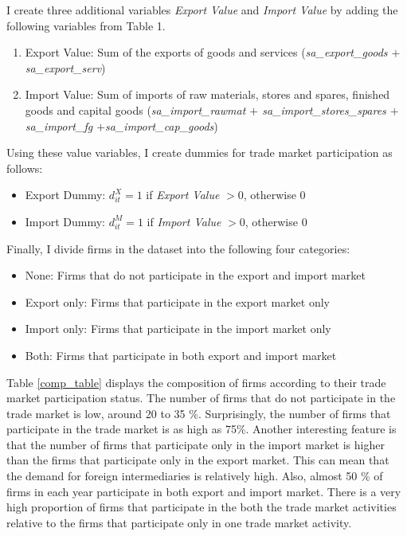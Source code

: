 \documentclass[12pt]{article}
\begin{document}
I create three additional variables \textit{Export Value} and
\textit{Import Value}
by adding the following variables from Table 1.  
\begin{enumerate}
\item Export Value: Sum of the exports of goods and services (\textit{sa\_export\_goods $+$ sa\_export\_serv})
\item Import Value: Sum of imports of raw materials, stores and spares,
  finished goods and capital goods (\textit{sa\_import\_rawmat $+$        sa\_import\_stores\_spares
  $+$ sa\_import\_fg            $+$sa\_import\_cap\_goods})
\end{enumerate}
Using these value variables, I create dummies for trade market
participation as follows:
\begin{itemize}
\item Export Dummy: $d_{it}^{X}=1$ if \textit{Export Value} $> 0$,
  otherwise $0$
\item Import Dummy: $d_{it}^{M}=1$ if \textit{Import Value} $> 0$, otherwise $0$
\end{itemize} 

Finally, I divide firms in the dataset into the following four categories:
\begin{itemize}
\item None: Firms that do not participate in the export and import
  market 
\item Export only: Firms that participate in the export market only
\item Import only: Firms that participate in the import market only
\item Both: Firms that participate in both export and import market
\end{itemize}

Table \ref{comp_table} displays the composition of firms according to their trade market
participation status. The number of firms that do not
participate in the trade market is low, around 20 to 35
\%. Surprisingly, the number of firms that participate in the trade
market is as high as 75\%. Another interesting feature is that the number
of firms that participate only in the import market is higher than the
firms that participate only in the export market. This can mean that
the demand for foreign intermediaries is relatively high. Also, almost 50 \% of
firms in each year participate in both export and import market. There is
a very high proportion of firms that participate in the both the trade market activities relative to the firms that
participate only in one trade market activity. 
\end{document}
